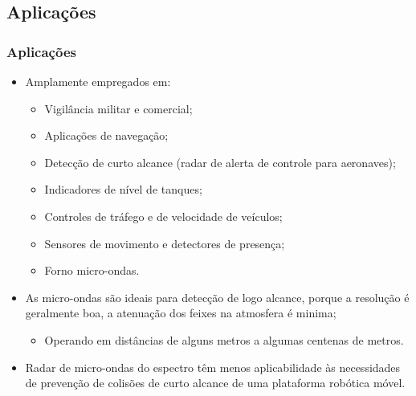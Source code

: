 \documentclass[xcolor=dvipsnames, aspectratio=169]{beamer}
\begin{document}
    \subsection[Aplicações]{Aplicações} 
    \begin{frame}
    \frametitle{Aplicações}
        \begin{itemize}
            \item Amplamente empregados em:
            \begin{itemize}
                \item Vigilância militar e comercial;
                \item Aplicações de navegação;
                \item Detecção de curto alcance (radar de alerta de controle para aeronaves);
                \item Indicadores de nível de tanques;
                \item Controles de tráfego e de velocidade de veículos;
                \item Sensores de movimento e detectores de presença;
                \item Forno micro-ondas.
            \end{itemize}
            \item As micro-ondas são ideais para detecção de logo alcance, porque a resolução é geralmente boa, a atenuação dos feixes na atmosfera é minima;
            \begin{itemize}
                \item Operando em distâncias de alguns metros a algumas centenas de metros.
            \end{itemize}
            \item Radar de micro-ondas do espectro têm menos aplicabilidade às necessidades de prevenção de colisões de curto alcance de uma plataforma robótica móvel.
        \end{itemize}
    \end{frame}
\end{document}
